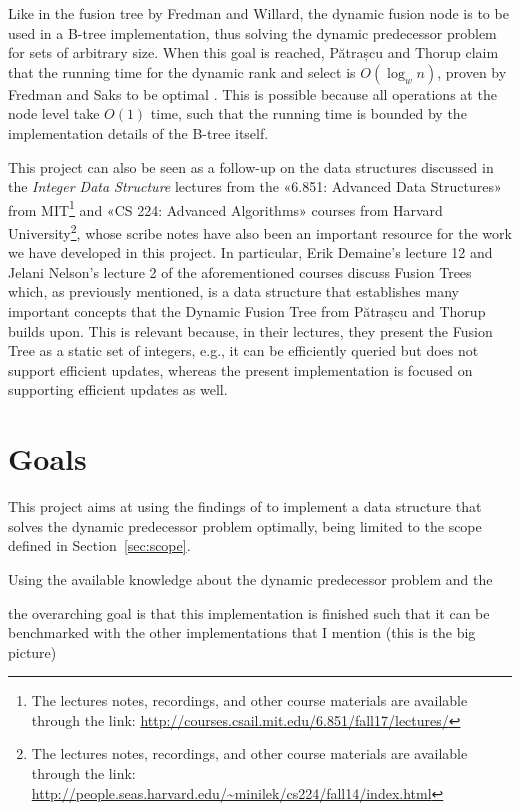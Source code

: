 Like in the fusion tree by Fredman and Willard, the dynamic fusion node is to be used in a B-tree implementation, thus solving the dynamic predecessor problem for sets of arbitrary size. When this goal is reached, Pătrașcu and Thorup claim that the running time for the dynamic rank and select is $O(\log_w n)$, proven by Fredman and Saks to be optimal \cite{fredman1989cell}. This is possible because all operations at the node level take $O(1)$ time, such that the running time is bounded by the implementation details of the B-tree itself.

This project can also be seen as a follow-up on the data structures discussed in the \textit{Integer Data Structure} lectures from the «6.851: Advanced Data Structures» from MIT\footnote{The lectures notes, recordings, and other course materials are available through the link: \url{http://courses.csail.mit.edu/6.851/fall17/lectures/}} and «CS 224: Advanced Algorithms» courses from Harvard University\footnote{The lectures notes, recordings, and other course materials are available through the link: \url{http://people.seas.harvard.edu/~minilek/cs224/fall14/index.html}}, whose scribe notes have also been an important resource for the work we have developed in this project. In particular, Erik Demaine's lecture 12 \cite{erikdemainelec12} and Jelani Nelson's lecture 2 \cite{nelsonjelanilec2} of the aforementioned courses discuss Fusion Trees which, as previously mentioned, is a data structure that establishes many important concepts that the Dynamic Fusion Tree from Pătrașcu and Thorup builds upon. 
This is relevant because, in their lectures, they present the Fusion Tree as a static set of integers, e.g., it can be efficiently queried but does not support efficient updates, whereas the present implementation is focused on supporting efficient updates as well.

\section{Goals}

This project aims at using the findings of \cite{patrascu2014dynamic} to implement a data structure that solves the dynamic predecessor problem optimally, being limited to the scope defined in Section~\ref{sec:scope}. 

Using the available knowledge about the dynamic predecessor problem and the 

the overarching goal is that this implementation is finished such that it can be benchmarked with the other implementations that I mention (this is the big picture)
    
